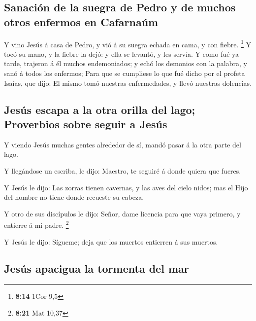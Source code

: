 \hypertarget{sanaciuxf3n-de-la-suegra-de-pedro-y-de-muchos-otros-enfermos-en-cafarnauxfam}{%
\subsection{Sanación de la suegra de Pedro y de muchos otros enfermos en
Cafarnaúm}\label{sanaciuxf3n-de-la-suegra-de-pedro-y-de-muchos-otros-enfermos-en-cafarnauxfam}}

 Y vino Jesús á casa de Pedro, y vió á su suegra echada
en cama, y con fiebre. \footnote{\textbf{8:14} 1Cor 9,5} 
Y tocó su mano, y la fiebre la dejó: y ella se levantó, y les servía.
 Y como fué ya tarde, trajeron á él muchos endemoniados;
y echó los demonios con la palabra, y sanó á todos los enfermos;
 Para que se cumpliese lo que fué dicho por el profeta
Isaías, que dijo: El mismo tomó nuestras enfermedades, y llevó nuestras
dolencias.

\hypertarget{jesuxfas-escapa-a-la-otra-orilla-del-lago-proverbios-sobre-seguir-a-jesuxfas}{%
\subsection{Jesús escapa a la otra orilla del lago; Proverbios sobre
seguir a
Jesús}\label{jesuxfas-escapa-a-la-otra-orilla-del-lago-proverbios-sobre-seguir-a-jesuxfas}}

 Y viendo Jesús muchas gentes alrededor de sí, mandó
pasar á la otra parte del lago.

 Y llegándose un escriba, le dijo: Maestro, te seguiré á
donde quiera que fueres.

 Y Jesús le dijo: Las zorras tienen cavernas, y las aves
del cielo nidos; mas el Hijo del hombre no tiene donde recueste su
cabeza.

 Y otro de sus discípulos le dijo: Señor, dame licencia
para que vaya primero, y entierre á mi padre. \footnote{\textbf{8:21}
  Mat 10,37}

 Y Jesús le dijo: Sígueme; deja que los muertos entierren
á sus muertos.

\hypertarget{jesuxfas-apacigua-la-tormenta-del-mar}{%
\subsection{Jesús apacigua la tormenta del
mar}\label{jesuxfas-apacigua-la-tormenta-del-mar}}

